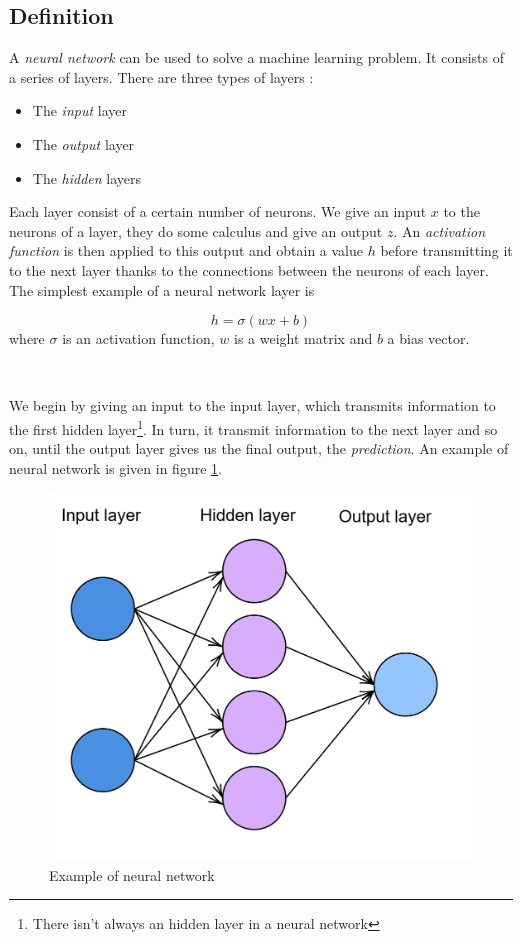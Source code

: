 \documentclass[10pt,a4paper]{article}
\theoremstyle{definition}
\theoremstyle{definition}
\theoremstyle{definition}
\begin{document}
\subsection{Definition}


\noindent A \textit{neural network} \cite{8} can be used to solve a machine learning problem. It consists of a series of layers. There are three types of layers :

\begin{itemize}
\item The \textit{input} layer
\item The \textit{output} layer
\item The \textit{hidden} layers
\end{itemize}

Each layer consist of a certain number of neurons. We give an input $x$ to the neurons of a layer, they do some calculus and give an output $z$. An \textit{activation function} is then applied to this output and obtain a value $h$ before transmitting it to the next layer thanks to the connections between the neurons of each layer. The simplest example of a neural network layer is 

$$
h = \sigma (wx +b)
$$
where $\sigma$ is an activation function, $w$ is a weight matrix and $b$ a bias vector.

~

We begin by giving an input to the input layer, which transmits information to the first hidden layer\footnote{There isn't always an hidden layer in a neural network}. In turn, it transmit information to the next layer and so on, until the output layer gives us the final output, the \textit{prediction}. An example of neural network is given in figure \ref{examplenn}.

\begin{figure}
\center
\includegraphics[scale=0.2]{nn.png}
\caption{Example of neural network}
\label{examplenn}
\end{figure}
\end{document}
